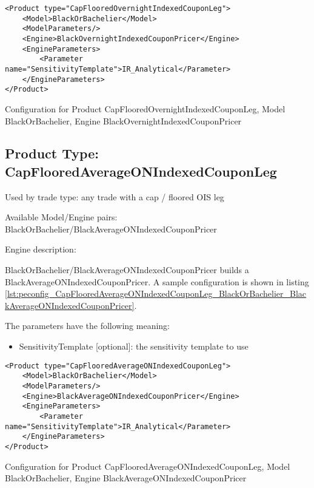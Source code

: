 \begin{longlisting}
\begin{verbatim}
<Product type="CapFlooredOvernightIndexedCouponLeg">
    <Model>BlackOrBachelier</Model>
    <ModelParameters/>
    <Engine>BlackOvernightIndexedCouponPricer</Engine>
    <EngineParameters>
        <Parameter name="SensitivityTemplate">IR_Analytical</Parameter>
    </EngineParameters>
</Product>
\end{verbatim}
\caption{Configuration for Product CapFlooredOvernightIndexedCouponLeg, Model BlackOrBachelier, Engine BlackOvernightIndexedCouponPricer}
\label{lst:peconfig_CapFlooredOvernightIndexedCouponLeg_BlackOrBachelier_BlackOvernightIndexedCouponPricer}
\end{longlisting}

\subsection{Product Type: CapFlooredAverageONIndexedCouponLeg}

Used by trade type: any trade with a cap / floored OIS leg

Available Model/Engine pairs: BlackOrBachelier/BlackAverageONIndexedCouponPricer

Engine description:

BlackOrBachelier/BlackAverageONIndexedCouponPricer builds a BlackAverageONIndexedCouponPricer. A sample configuration is
shown in listing \ref{lst:peconfig_CapFlooredAverageONIndexedCouponLeg_BlackOrBachelier_BlackAverageONIndexedCouponPricer}.

The parameters have the following meaning:

\begin{itemize}
\item SensitivityTemplate [optional]: the sensitivity template to use 
\end{itemize}

\begin{longlisting}
\begin{verbatim}
<Product type="CapFlooredAverageONIndexedCouponLeg">
    <Model>BlackOrBachelier</Model>
    <ModelParameters/>
    <Engine>BlackAverageONIndexedCouponPricer</Engine>
    <EngineParameters>
        <Parameter name="SensitivityTemplate">IR_Analytical</Parameter>
    </EngineParameters>
</Product>
\end{verbatim}
\caption{Configuration for Product CapFlooredAverageONIndexedCouponLeg, Model BlackOrBachelier, Engine BlackAverageONIndexedCouponPricer}
\label{lst:peconfig_CapFlooredAverageONIndexedCouponLeg_BlackOrBachelier_BlackAverageONIndexedCouponPricer}
\end{longlisting}

